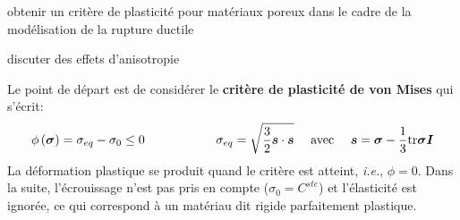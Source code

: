 \documentclass[french,english,12pt]{exam}
\begin{document}
\thispagestyle{empty}

\begin{objectifs}
\item obtenir un critère de plasticité pour matériaux poreux dans le cadre de la modélisation de la rupture ductile
\item discuter des effets d'anisotropie
\end{objectifs}

 Le point de départ est de considérer le \textbf{critère de plasticité de von Mises} qui s'écrit:
\begin{equation}
  \phi\left( \boldsymbol{\sigma}   \right) =  \sigma_{eq} - \sigma_0 \leq 0 \hspace{2cm} \sigma_{eq} = \sqrt{\frac{3}{2} \boldsymbol{s} \cdot \boldsymbol{s}} \ \ \ \ \mathrm{avec} \ \ \ \ \boldsymbol{s} = \boldsymbol{\sigma} - \frac{1}{3} \mathrm{tr}\boldsymbol{\sigma} \boldsymbol{I}
  \label{eq1}
\end{equation}
La déformation plastique se produit quand le critère est atteint, \textit{i.e.}, $\phi = 0$. Dans la suite, l'écrouissage n'est pas pris en compte ($\sigma_0 = C^{ste}$) et l'élasticité est ignorée, ce qui correspond à un matériau dit rigide parfaitement plastique.
\end{document}
